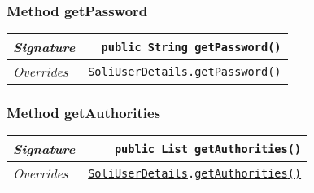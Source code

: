 \begin{adjustwidth}{1.5em}{0pt}
\begin{adjustwidth}{1.5em}{0pt}
\begin{adjustwidth}{1.5em}{0pt}
{\begin{tabularx}{1.0\linewidth}{@{}l R@{}}
      \end{tabularx}}
    \end{adjustwidth}\subsubsection{Method getPassword\label{edu.kit.hci.soli.config.security.SoliGuestUserDetails@getPassword()}}
    \begin{adjustwidth}{1.5em}{0pt}
      {\begin{tabularx}{1.0\linewidth}{@{}l R@{}}
        \emph{Signature} & \texttt{public \texttt{String} getPassword()} \\
        \hline
        \emph{Overrides} & \texttt{\texttt{\hyperref[edu.kit.hci.soli.config.security.SoliUserDetails]{\texttt{SoliUserDetails}}}.\hyperref[edu.kit.hci.soli.config.security.SoliUserDetails@getPassword()]{getPassword}\hyperref[edu.kit.hci.soli.config.security.SoliUserDetails@getPassword()]{(}\hyperref[edu.kit.hci.soli.config.security.SoliUserDetails@getPassword()]{)}} \\
        \hline
  
      \end{tabularx}}
    \end{adjustwidth}\subsubsection{Method getAuthorities\label{edu.kit.hci.soli.config.security.SoliGuestUserDetails@getAuthorities()}}
    \begin{adjustwidth}{1.5em}{0pt}
      {\begin{tabularx}{1.0\linewidth}{@{}l R@{}}
        \emph{Signature} & \texttt{public \texttt{List} getAuthorities()} \\
        \hline
        \emph{Overrides} & \texttt{\texttt{\hyperref[edu.kit.hci.soli.config.security.SoliUserDetails]{\texttt{SoliUserDetails}}}.\hyperref[edu.kit.hci.soli.config.security.SoliUserDetails@getAuthorities()]{getAuthorities}\hyperref[edu.kit.hci.soli.config.security.SoliUserDetails@getAuthorities()]{(}\hyperref[edu.kit.hci.soli.config.security.SoliUserDetails@getAuthorities()]{)}} \\
        \hline
  

\end{tabularx}}
\end{adjustwidth}
\end{adjustwidth}
\end{adjustwidth}
